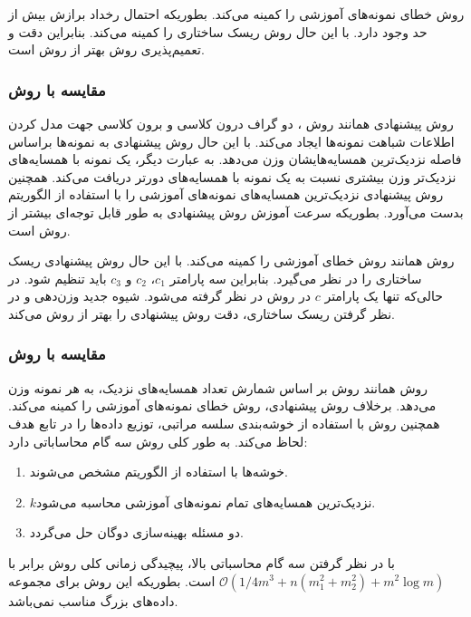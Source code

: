 روش  خطای نمونه‌های آموزشی را کمینه می‌کند. بطوریکه احتمال رخداد برازش بیش از حد وجود دارد. با این حال روش  ریسک ساختاری را کمینه می‌کند. بنابراین دقت و تعمیم‌پذیری روش  بهتر از روش  است.

\subsubsection{مقایسه با روش }\label{sec:4:6:2:2}
روش پیشنهادی همانند روش ، دو گراف درون کلاسی و برون کلاسی جهت مدل کردن اطلاعات شباهت نمونه‌ها ایجاد می‌کند. با این حال روش پیشنهادی به نمونه‌ها براساس فاصله نزدیک‌ترین همسایه‌هایشان وزن می‌دهد. به عبارت دیگر، یک نمونه با همسایه‌های نزدیک‌تر وزن بیشتری نسبت به یک نمونه با همسایه‌های دورتر دریافت می‌کند. همچنین روش پیشنهادی نزدیک‌ترین همسایه‌های نمونه‌های آموزشی را با استفاده از الگوریتم  بدست می‌آورد. بطوریکه سرعت آموزش روش پیشنهادی به طور قابل توجه‌ای بیشتر از روش  است.

روش  همانند روش  خطای آموزشی را کمینه می‌کند. با این حال روش پیشنهادی ریسک ساختاری را در نظر می‌گیرد. بنابراین سه پارامتر  $c_{1}$،  $c_{2}$ و  $c_{3}$ باید تنظیم شود. در حالی‌که تنها یک پارامتر $c$ در روش  در نظر گرفته می‌شود. شیوه جدید وزن‌دهی و در نظر گرفتن ریسک ساختاری، دقت روش پیشنهادی را بهتر از روش  می‌کند.

\subsubsection{مقایسه با روش }\label{sec:4:6:2:3}
روش  همانند روش  بر اساس شمارش تعداد همسایه‌های نزدیک، به هر نمونه وزن می‌دهد. برخلاف روش پیشنهادی، روش  خطای نمونه‌های آموزشی را کمینه می‌کند. همچنین روش  با استفاده از خوشه‌بندی سلسه مراتبی، توزیع داده‌ها را در تابع هدف لحاظ می‌کند. به طور کلی روش  سه گام محاساباتی دارد:
\begin{enumerate}
	\item خوشه‌ها با استفاده از الگوریتم  مشخص می‌شوند.
	\item $k$نزدیک‌ترین همسایه‌های تمام نمونه‌های آموزشی محاسبه می‌شود.
	\item دو مسئله بهینه‌سازی دوگان حل می‌گردد.
\end{enumerate}

با در نظر گرفتن سه گام محاسباتی بالا، پیچیدگی زمانی کلی روش  برابر با  $\mathcal{O}(1/4m^{3} + n(m^{2}_{1} + m^{2}_{2}) + m^{2}\log{m})$ است. بطوریکه این روش برای مجموعه داده‌های بزرگ مناسب نمی‌باشد.

